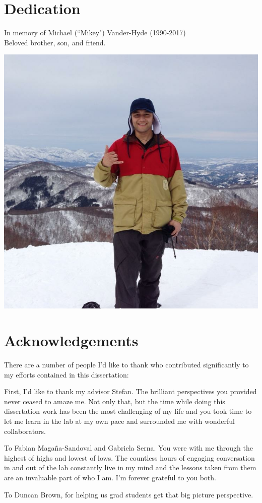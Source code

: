 \documentclass[12pt]{report}
\begin{document}
\chapter*{Dedication}
In memory of Michael (``Mikey") Vander-Hyde (1990-2017)
\\
Beloved brother, son, and friend.

\begin{center}
\includegraphics[width=.75\textwidth]{mikey.jpeg}
\end{center}

\chapter*{Acknowledgements}
There are a number of people I’d like to thank who contributed significantly to my efforts contained in this dissertation:

First, I’d like to thank my advisor Stefan. The brilliant perspectives you provided never ceased to amaze me. Not only that, but the time while doing this dissertation work has been the most challenging of my life and you took time to let me learn in the lab at my own pace and surrounded me with wonderful collaborators. 

To Fabian Maga\~{n}a-Sandoval and Gabriela Serna. You were with me through the highest of highs and lowest of lows. The countless hours of engaging conversation in and out of the lab constantly live in my mind and the lessons taken from them are an invaluable part of who I am. I’m forever grateful to you both. 

To Duncan Brown, for helping us grad students get that big picture perspective.
\end{document}
